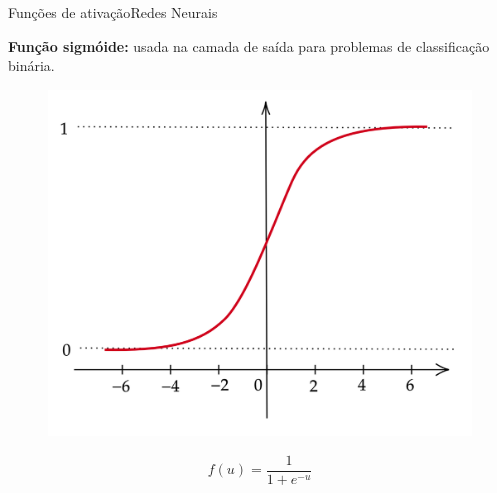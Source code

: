 \documentclass[t]{beamer}
\begin{document}
\begin{ftst}{Funções de ativação}{Redes Neurais}

\textbf{Função sigmóide:} usada na camada de saída para problemas de classificação binária.
\begin{figure}[!htb]
    \centering
    \begin{minipage}{.5\textwidth}
        \centering
        \includegraphics[scale=0.12]{Figuras/sigmoide.png}
        \label{fig:prob1_6_2}
    \end{minipage}%
    \begin{minipage}{0.5\textwidth}
        \centering
        \begin{equation}
            f(u) = \frac{1}{1+e^{-u}}
        \end{equation}
         \left [ 0, 1]
    \end{minipage}
\end{figure}
\end{ftst}

\end{document}
